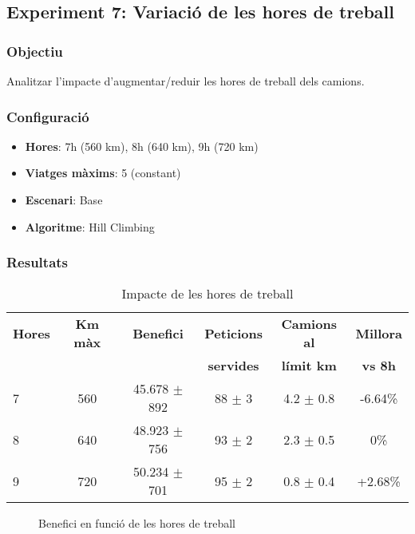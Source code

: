\subsection{Experiment 7: Variació de les hores de treball}

\subsubsection{Objectiu}
Analitzar l'impacte d'augmentar/reduir les hores de treball dels camions.

\subsubsection{Configuració}
\begin{itemize}
    \item \textbf{Hores}: 7h (560 km), 8h (640 km), 9h (720 km)
    \item \textbf{Viatges màxims}: 5 (constant)
    \item \textbf{Escenari}: Base
    \item \textbf{Algoritme}: Hill Climbing
\end{itemize}

\subsubsection{Resultats}

\begin{table}[H]
\centering
\begin{tabular}{@{}lccccc@{}}
\toprule
\textbf{Hores} & \textbf{Km màx} & \textbf{Benefici} & \textbf{Peticions} & \textbf{Camions al} & \textbf{Millora} \\
 & & & \textbf{servides} & \textbf{límit km} & \textbf{vs 8h} \\
\midrule
7 & 560 & 45.678 $\pm$ 892 & 88 $\pm$ 3 & 4.2 $\pm$ 0.8 & -6.64\% \\
8 & 640 & 48.923 $\pm$ 756 & 93 $\pm$ 2 & 2.3 $\pm$ 0.5 & 0\% \\
9 & 720 & 50.234 $\pm$ 701 & 95 $\pm$ 2 & 0.8 $\pm$ 0.4 & +2.68\% \\
\bottomrule
\end{tabular}
\caption{Impacte de les hores de treball}
\label{tab:exp7-hores}
\end{table}

\begin{figure}[H]
\centering
\caption{Benefici en funció de les hores de treball}
\label{fig:exp7-hores}
\end{figure}

